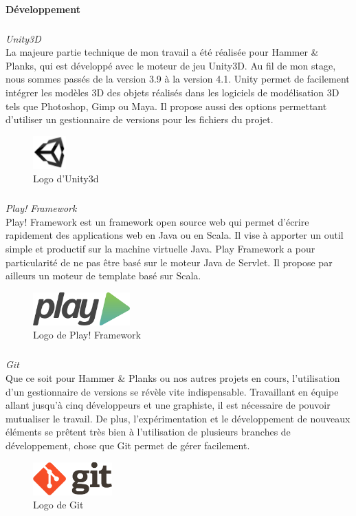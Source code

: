 		\paragraph{Développement}
		\subparagraph{} \emph{Unity3D\\}
La majeure partie technique de mon travail a été réalisée pour Hammer \& Planks, qui est développé avec le moteur de jeu Unity3D. Au fil de mon stage, nous sommes passés de la version 3.9 à la version 4.1. Unity permet de facilement intégrer les modèles 3D des objets réalisés dans les logiciels de modélisation 3D tels que Photoshop, Gimp ou Maya. Il propose aussi des options permettant d'utiliser un gestionnaire de versions pour les fichiers du projet.
	\begin{figure}[!h]
		\centering
		\includegraphics[height=48px]{images/unity.jpg}
		\caption{Logo d'Unity3d}
		\label{logo_unity}
	\end{figure}

		\subparagraph{} \emph{Play! Framework\\}
Play! Framework est un framework open source web qui permet d'écrire rapidement des applications web en Java ou en Scala. Il vise à apporter un outil simple et productif sur la machine virtuelle Java. Play Framework a pour particularité de ne pas être basé sur le moteur Java de Servlet. Il propose par ailleurs un moteur de template basé sur Scala.
	\begin{figure}[!h]
		\centering
		\includegraphics[height=48px]{images/play.png}
		\caption{Logo de Play! Framework}
		\label{logo_play}
	\end{figure}		

		\subparagraph{} \emph{Git\\}
Que ce soit pour Hammer \& Planks ou nos autres projets en cours, l'utilisation d'un gestionnaire de versions se révèle vite indispensable. Travaillant en équipe allant jusqu'à cinq développeurs et une graphiste, il est nécessaire de pouvoir mutualiser le travail. De plus, l'expérimentation et le développement de nouveaux éléments se prêtent très bien à l'utilisation de plusieurs branches de développement, chose que Git permet de gérer facilement.
	\begin{figure}[!h]
		\centering
		\includegraphics[height=48px]{images/git.png}
		\caption{Logo de Git}
		\label{logo_git}
	\end{figure}

